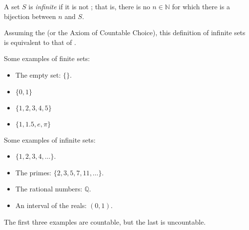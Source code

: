 \documentclass{article}
\begin{document}

A set $S$ is \emph{infinite} if it is not ; that is, there is no $n \in \mathbb{N}$ for which there is a bijection between $n$ and $S$.  

Assuming the  (or the Axiom of Countable Choice), this definition of infinite sets is equivalent to that of .

Some examples of finite sets:

\begin{itemize}
\item The empty set: $\{\}$.
\item $\{0, 1\}$
\item $\{1, 2, 3, 4 , 5\}$
\item $\{1,1.5, e, \pi\}$
\end{itemize}

Some examples of infinite sets:

\begin{itemize}
\item $\{1, 2, 3, 4, \ldots\}$.
\item The primes: $\{2, 3, 5, 7, 11, \ldots\}$.
\item The rational numbers: $\mathbb{Q}$.
\item An interval of the reals: $(0, 1)$.
\end{itemize}

The first three examples are countable, but the last is uncountable.
\end{document}

